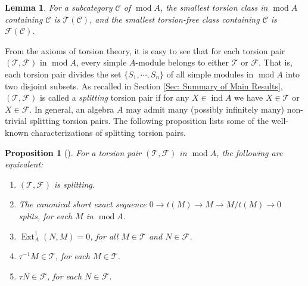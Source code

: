 \documentclass{amsart}
\theoremstyle{thmstyle}
\newtheorem{lemma}[thm]{Lemma}
\newtheorem{proposition}[thm]{Proposition}
\theoremstyle{exstyle}
\theoremstyle{defstyle}
\theoremstyle{remstyle}
\theoremstyle{remstyle}
\newcommand{\Ext}{\operatorname{Ext}}
\DeclareMathOperator*{\modu}{mod}
\DeclareMathOperator*{\ind}{ind}
\begin{document}
\begin{lemma}\label{Smallest Torsion Class}
For a subcategory $\mathcal{C}$ of $\modu A$, the smallest torsion class in $\modu A$ containing $\mathcal{C}$ is $\mathcal{T}(\mathcal{C})$, and the smallest torsion-free class containing $\mathcal{C}$ is $\mathcal{F}(\mathcal{C})$.
\end{lemma}

From the axioms of torsion theory, it is easy to see that for each torsion pair $(\mathcal{T},\mathcal{F})$ in $\modu A$, every simple $A$-module belongs to either $\mathcal{T}$ or $\mathcal{F}$. That is, each torsion pair divides the set $\{S_1, \cdots, S_n\}$ of all simple modules in $\modu A$ into two disjoint subsets.
As recalled in Section \ref{Sec: Summary of Main Results}, $(\mathcal{T},\mathcal{F})$ is called a \emph{splitting} torsion pair if for any $X \in \ind A$ we have $X \in \mathcal{T}$ or $X \in \mathcal{F}$.  
In general, an algebra $A$ may admit many (possibly infinitely many) non-trivial splitting torsion pairs. The following proposition lists some of the well-known characterizations of splitting torsion pairs.

\begin{proposition}[{\cite[VI. Prop. 1.7]{ASS}}]\label{Prop: splitting pairs}
For a torsion pair $(\mathcal{T},\mathcal{F})$ in $\modu A$, the following are equivalent:
\begin{enumerate}
    \item $(\mathcal{T},\mathcal{F})$ is splitting.
    \item The canonical short exact sequence $0 \rightarrow t(M) \rightarrow M \rightarrow M/t(M)\rightarrow 0$ splits, for each $M$ in $\modu A$.
    \item $\Ext^1_A(N,M)=0$, for all $M \in \mathcal{T}$ and $N\in \mathcal{F}$.
    \item $\tau^{-1}M \in \mathcal{T}$, for each $M\in \mathcal{T}$.
    \item $\tau N \in \mathcal{F}$, for each $N\in \mathcal{F}$.
\end{enumerate}
\end{proposition}
\end{document}
